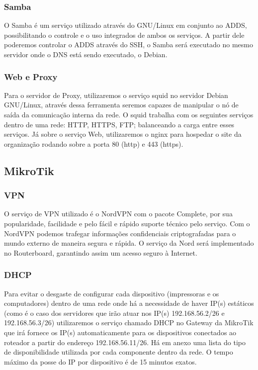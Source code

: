 \documentclass[12pt]{article}
\begin{document}
\subsubsection{Samba}
O Samba é um serviço utilizado através do GNU/Linux em conjunto ao ADDS, possibilitando o controle e o uso integrados de ambos os serviços. A partir dele poderemos controlar o ADDS através do SSH, o Samba será executado no mesmo servidor onde o DNS está sendo executado, o Debian.

\subsubsection{Web e Proxy}
Para o servidor de Proxy, utilizaremos o serviço squid no servidor Debian GNU/Linux, através dessa ferramenta seremos capazes de manipular o nó de saída da comunicação interna da rede. O squid trabalha com os seguintes serviços dentro de uma rede: HTTP, HTTPS, FTP; balanceando a carga entre esses serviços. Já sobre o serviço Web, utilizaremos o nginx para hospedar o site da organização rodando sobre a porta 80 (http) e 443 (https).

\subsection{MikroTik}

\subsubsection{VPN}
O serviço de VPN utilizado é o NordVPN com o pacote Complete, por sua popularidade, facilidade e pelo fácil e rápido suporte técnico pelo serviço. Com o NordVPN podemos trafegar informações confidenciais criptografadas para o mundo externo de maneira segura e rápida. O serviço da Nord será implementado no Routerboard, garantindo assim um acesso seguro à Internet.

\subsubsection{DHCP}
Para evitar o desgaste de configurar cada dispositivo (impressoras e os computadores) dentro de uma rede onde há a necessidade de haver IP(s) estáticos (como é o caso dos servidores que irão atuar nos IP(s) 192.168.56.2/26 e 192.168.56.3/26) utilizaremos o serviço chamado DHCP no Gateway da MikroTik que irá fornece os IP(s) automaticamente para os dispositivos conectados ao roteador a partir do endereço 192.168.56.11/26. Há em anexo uma lista do tipo de disponibilidade utilizada por cada componente dentro da rede. O tempo máximo da posse do IP por dispositivo é de 15 minutos exatos.
\end{document}
